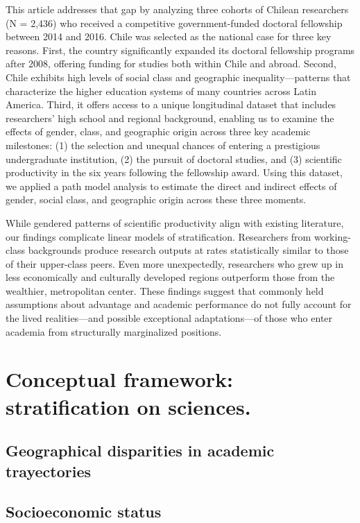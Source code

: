 \documentclass[
  spanish,
  12pt,
  letterpaper,
]{article}
\begin{document}
This article addresses that gap by analyzing three cohorts of Chilean
researchers (N = 2,436) who received a competitive government-funded
doctoral fellowship between 2014 and 2016. Chile was selected as the
national case for three key reasons. First, the country significantly
expanded its doctoral fellowship programs after 2008, offering funding
for studies both within Chile and abroad. Second, Chile exhibits high
levels of social class and geographic inequality---patterns that
characterize the higher education systems of many countries across Latin
America. Third, it offers access to a unique longitudinal dataset that
includes researchers' high school and regional background, enabling us
to examine the effects of gender, class, and geographic origin across
three key academic milestones: (1) the selection and unequal chances of
entering a prestigious undergraduate institution, (2) the pursuit of
doctoral studies, and (3) scientific productivity in the six years
following the fellowship award. Using this dataset, we applied a path
model analysis to estimate the direct and indirect effects of gender,
social class, and geographic origin across these three moments.

While gendered patterns of scientific productivity align with existing
literature, our findings complicate linear models of stratification.
Researchers from working-class backgrounds produce research outputs at
rates statistically similar to those of their upper-class peers. Even
more unexpectedly, researchers who grew up in less economically and
culturally developed regions outperform those from the wealthier,
metropolitan center. These findings suggest that commonly held
assumptions about advantage and academic performance do not fully
account for the lived realities---and possible exceptional
adaptations---of those who enter academia from structurally marginalized
positions.

\section{Conceptual framework: stratification on
sciences.}\label{conceptual-framework-stratification-on-sciences.}

\subsection{Geographical disparities in academic
trayectories}\label{geographical-disparities-in-academic-trayectories}

\subsection{Socioeconomic status}\label{socioeconomic-status}
\end{document}
